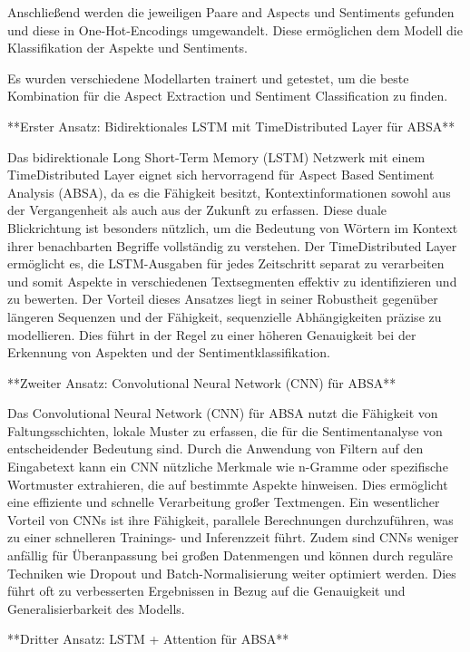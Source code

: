 \documentclass[12pt]{article}
\begin{document}
Anschließend werden die jeweiligen Paare and Aspects und Sentiments gefunden und diese in One-Hot-Encodings umgewandelt. Diese ermöglichen dem Modell die Klassifikation der Aspekte und Sentiments.

Es wurden verschiedene Modellarten trainert und getestet, um die beste Kombination für die Aspect Extraction und Sentiment Classification zu finden.

**Erster Ansatz: Bidirektionales LSTM mit TimeDistributed Layer für ABSA**

Das bidirektionale Long Short-Term Memory (LSTM) Netzwerk mit einem TimeDistributed Layer eignet sich hervorragend für Aspect Based Sentiment Analysis (ABSA), da es die Fähigkeit besitzt, Kontextinformationen sowohl aus der Vergangenheit als auch aus der Zukunft zu erfassen. Diese duale Blickrichtung ist besonders nützlich, um die Bedeutung von Wörtern im Kontext ihrer benachbarten Begriffe vollständig zu verstehen. Der TimeDistributed Layer ermöglicht es, die LSTM-Ausgaben für jedes Zeitschritt separat zu verarbeiten und somit Aspekte in verschiedenen Textsegmenten effektiv zu identifizieren und zu bewerten. Der Vorteil dieses Ansatzes liegt in seiner Robustheit gegenüber längeren Sequenzen und der Fähigkeit, sequenzielle Abhängigkeiten präzise zu modellieren. Dies führt in der Regel zu einer höheren Genauigkeit bei der Erkennung von Aspekten und der Sentimentklassifikation.

**Zweiter Ansatz: Convolutional Neural Network (CNN) für ABSA**

Das Convolutional Neural Network (CNN) für ABSA nutzt die Fähigkeit von Faltungsschichten, lokale Muster zu erfassen, die für die Sentimentanalyse von entscheidender Bedeutung sind. Durch die Anwendung von Filtern auf den Eingabetext kann ein CNN nützliche Merkmale wie n-Gramme oder spezifische Wortmuster extrahieren, die auf bestimmte Aspekte hinweisen. Dies ermöglicht eine effiziente und schnelle Verarbeitung großer Textmengen. Ein wesentlicher Vorteil von CNNs ist ihre Fähigkeit, parallele Berechnungen durchzuführen, was zu einer schnelleren Trainings- und Inferenzzeit führt. Zudem sind CNNs weniger anfällig für Überanpassung bei großen Datenmengen und können durch reguläre Techniken wie Dropout und Batch-Normalisierung weiter optimiert werden. Dies führt oft zu verbesserten Ergebnissen in Bezug auf die Genauigkeit und Generalisierbarkeit des Modells.

**Dritter Ansatz: LSTM + Attention für ABSA**
\end{document}
